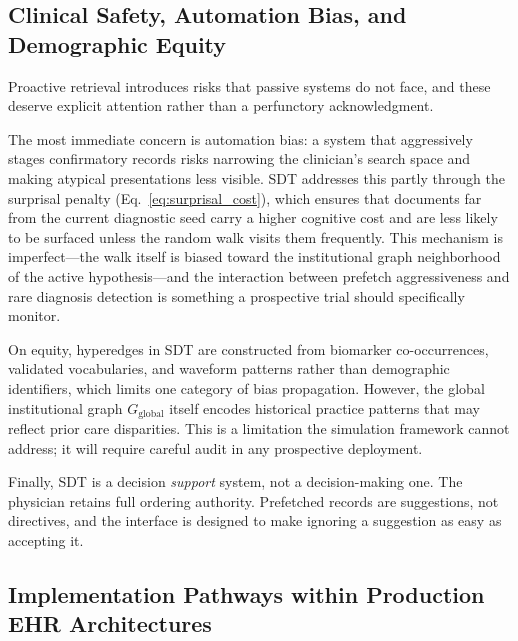\documentclass[10pt, onecolumn]{article}
\begin{document}
\subsection{Clinical Safety, Automation Bias, and Demographic Equity}

Proactive retrieval introduces risks that passive systems do not face, and these deserve explicit attention rather than a perfunctory acknowledgment.

The most immediate concern is automation bias: a system that aggressively stages confirmatory records risks narrowing the clinician's search space and making atypical presentations less visible. SDT addresses this partly through the surprisal penalty (Eq.~\eqref{eq:surprisal_cost}), which ensures that documents far from the current diagnostic seed carry a higher cognitive cost and are less likely to be surfaced unless the random walk visits them frequently. This mechanism is imperfect---the walk itself is biased toward the institutional graph neighborhood of the active hypothesis---and the interaction between prefetch aggressiveness and rare diagnosis detection is something a prospective trial should specifically monitor.

On equity, hyperedges in SDT are constructed from biomarker co-occurrences, validated vocabularies, and waveform patterns rather than demographic identifiers, which limits one category of bias propagation. However, the global institutional graph $G_{\text{global}}$ itself encodes historical practice patterns that may reflect prior care disparities. This is a limitation the simulation framework cannot address; it will require careful audit in any prospective deployment.

Finally, SDT is a decision \emph{support} system, not a decision-making one. The physician retains full ordering authority. Prefetched records are suggestions, not directives, and the interface is designed to make ignoring a suggestion as easy as accepting it.

\subsection{Implementation Pathways within Production EHR Architectures}
\end{document}
